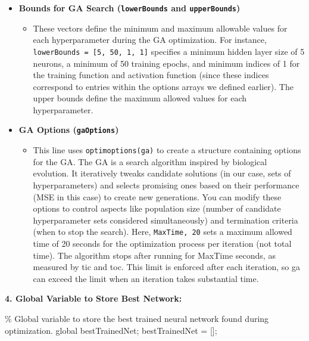 \documentclass[
]{agujournal2019}
\newenvironment{Shaded}{\begin{snugshade}}{\end{snugshade}}
\newcommand{\CommentTok}[1]{\textcolor[rgb]{0.37,0.37,0.37}{#1}}
\newcommand{\KeywordTok}[1]{\textcolor[rgb]{0.00,0.23,0.31}{#1}}
\newcommand{\NormalTok}[1]{\textcolor[rgb]{0.00,0.23,0.31}{#1}}
\newcommand{\OperatorTok}[1]{\textcolor[rgb]{0.37,0.37,0.37}{#1}}
\newcommand{\VariableTok}[1]{\textcolor[rgb]{0.07,0.07,0.07}{#1}}
\providecommand{\tightlist}{%
  \setlength{\itemsep}{0pt}\setlength{\parskip}{0pt}}\usepackage{longtable,booktabs,array}
\begin{document}
\begin{itemize}
\tightlist
\item
  \textbf{Bounds for GA Search (\texttt{lowerBounds} and
  \texttt{upperBounds})}

  \begin{itemize}
  \tightlist
  \item
    These vectors define the minimum and maximum allowable values for
    each hyperparameter during the GA optimization. For instance,
    \texttt{lowerBounds\ =\ {[}5,\ 50,\ 1,\ 1{]}} specifies a minimum
    hidden layer size of 5 neurons, a minimum of 50 training epochs, and
    minimum indices of 1 for the training function and activation
    function (since these indices correspond to entries within the
    options arrays we defined earlier). The upper bounds define the
    maximum allowed values for each hyperparameter.
  \end{itemize}
\item
  \textbf{GA Options (\texttt{gaOptions})}

  \begin{itemize}
  \tightlist
  \item
    This line uses
    \texttt{optimoptions(\textquotesingle{}ga\textquotesingle{})} to
    create a structure containing options for the GA. The GA is a search
    algorithm inspired by biological evolution. It iteratively tweaks
    candidate solutions (in our case, sets of hyperparameters) and
    selects promising ones based on their performance (MSE in this case)
    to create new generations. You can modify these options to control
    aspects like population size (number of candidate hyperparameter
    sets considered simultaneously) and termination criteria (when to
    stop the search). Here,
    \texttt{\textquotesingle{}MaxTime\textquotesingle{},\ 20} sets a
    maximum allowed time of 20 seconds for the optimization process per
    iteration (not total time). The algorithm stops after running for
    MaxTime seconds, as measured by tic and toc. This limit is enforced
    after each iteration, so ga can exceed the limit when an iteration
    takes substantial time.
  \end{itemize}
\end{itemize}

\textbf{4. Global Variable to Store Best Network:}

\begin{Shaded}
\begin{Highlighting}[]
    \CommentTok{\% Global variable to store the best trained neural network found during optimization.}
    \KeywordTok{global} \VariableTok{bestTrainedNet}\OperatorTok{;}
    \VariableTok{bestTrainedNet} \OperatorTok{=}\NormalTok{ []}\OperatorTok{;}
\end{Highlighting}
\end{Shaded}
\end{document}
